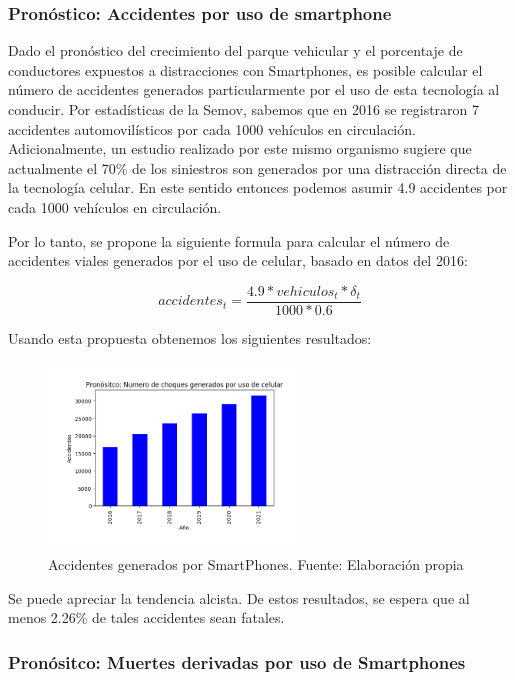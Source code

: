 \documentclass{article}
\begin{document}
\subsubsection{Pronóstico: Accidentes por uso de smartphone}

Dado el pronóstico del crecimiento del parque vehicular y el porcentaje de conductores expuestos a
distracciones con Smartphones, es posible calcular el número de accidentes generados particularmente
por el uso de esta tecnología al conducir. Por estadísticas de la Semov, sabemos que en 2016 se registraron 7
accidentes automovilísticos por cada 1000 vehículos en circulación. Adicionalmente, un estudio realizado por este
mismo organismo sugiere que actualmente el 70\% de los siniestros son generados por una distracción directa de la
tecnología celular. En este sentido entonces podemos asumir 4.9 accidentes por cada 1000 vehículos en circulación.

Por lo tanto, se propone la siguiente formula para calcular el número de accidentes viales generados por el uso
de celular, basado en datos del 2016:

\begin{equation}
accidentes_{t} = \frac{4.9 * vehiculos_t * \delta_t}{1000 * 0.6}
\end{equation}

Usando esta propuesta obtenemos los siguientes resultados:

	\begin{figure}[H]\centering
	\includegraphics[width=0.6\textwidth]{resources/img/smart_accidents.png}
	\caption{\label{fig:smart_accidents} Accidentes generados por SmartPhones. Fuente: Elaboración propia}
    \end{figure}

Se puede apreciar la tendencia alcista. De estos resultados, se espera que al menos 2.26\% de tales accidentes sean
fatales.

\subsubsection{Pronósitco: Muertes derivadas por uso de Smartphones}
\end{document}
